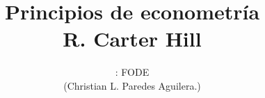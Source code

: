 \normalfont

\author{\Large : FODE \\ \small (Christian L. Paredes Aguilera.)}
\title{Principios de econometría \\ \small R. Carter Hill}
\date{}
\pagestyle{empty}
\maketitle
\thispagestyle{empty}
\let\cleardoublepage\clearpage
\tableofcontents								%


 
\let\cleardoublepage\clearpage
